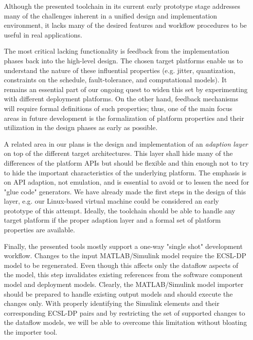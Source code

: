 Although the presented toolchain in its current early prototype
stage addresses many of the challenges inherent in a unified design
and implementation environment, it lacks many of the desired
features and workflow procedures to be useful in real applications.

The most critical lacking functionality is feedback from the
implementation phases back into the
high-level design. The chosen target platforms enable us to
understand the nature of these influential properties (e.g. jitter,
quantization, constraints on the schedule, fault-tolerance, and computational models). It remains an essential part of
our ongoing quest to widen this set by experimenting with different
deployment platforms. On the other hand, feedback mechanisms will
require formal definitions of such properties; thus, one of the main
focus areas in future development is the formalization of platform
properties and their utilization in the design phases as early as
possible.

A related area in our plans is the design and implementation of an
\emph{adaption layer} on top of the different target architectures.
This layer shall hide many of the differences of the platform APIs
but should be flexible and thin enough not to try to hide the
important characteristics of the underlying platform. The emphasis
is on API adaption, not emulation, and is essential to avoid or to
lessen the need for "glue code" generators. We have already made the
first steps in the design of this layer, e.g. our Linux-based virtual
machine could be considered an early prototype of this attempt.
Ideally, the toolchain should be able to handle any target platform
if the proper adaption layer and a formal set of platform properties
are available.

Finally, the presented tools mostly support a one-way "single shot"
development workflow. Changes to the input MATLAB/Simulink model
require the ECSL-DP model to be regenerated.
Even though this affects only the dataflow aspects of the model,
this step invalidates existing references from the software
component model and deployment models. Clearly, the MATLAB/Simulink
model importer should be prepared to handle existing output models
and should execute the changes only. With properly identifying the
Simulink elements and their corresponding ECSL-DP pairs and by
restricting the set of supported changes to the dataflow models, we will be able to overcome this limitation without bloating
the importer tool.

